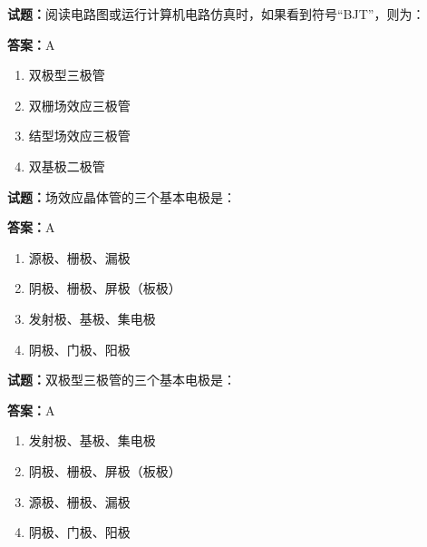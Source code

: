 \documentclass{ctexbook}
\begin{document}




\vspace{1em}

\textbf{试题：}阅读电路图或运行计算机电路仿真时，如果看到符号“BJT”，则为： 

\textbf{答案：}A 

\begin{enumerate}[leftmargin=3em]
  \item 双极型三极管 

  \item 双栅场效应三极管 

  \item 结型场效应三极管 

  \item 双基极二极管 

\end{enumerate}





\vspace{1em}

\textbf{试题：}场效应晶体管的三个基本电极是： 

\textbf{答案：}A 

\begin{enumerate}[leftmargin=3em]
  \item 源极、栅极、漏极 

  \item 阴极、栅极、屏极（板极） 

  \item 发射极、基极、集电极 

  \item 阴极、门极、阳极 

\end{enumerate}





\vspace{1em}

\textbf{试题：}双极型三极管的三个基本电极是： 

\textbf{答案：}A 

\begin{enumerate}[leftmargin=3em]
  \item 发射极、基极、集电极 

  \item 阴极、栅极、屏极（板极） 

  \item 源极、栅极、漏极 

  \item 阴极、门极、阳极 

\end{enumerate}
\end{document}

